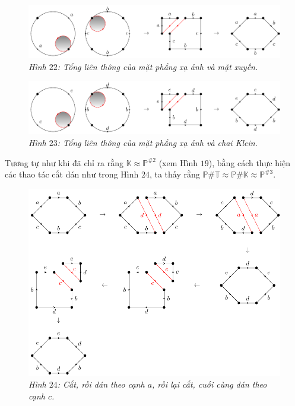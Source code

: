 \begin{multicols}{2}
\begin{figure}[H]
		\vspace*{-5pt}
		\centering\captionsetup{labelformat=empty, justification=centering}
		\includegraphics[width=1\linewidth]{H22.pdf}
		\caption{\small\textit{\color{duongvaotoanhoc}Hình $22$: Tổng liên thông của mặt phẳng xạ ảnh và mặt xuyến.}}
		\vspace*{-10pt}
	\end{figure}
	\begin{figure}[H]
		\vspace*{-5pt}
		\centering\captionsetup{labelformat=empty, justification=centering}
		\includegraphics[width=1\linewidth]{H23.pdf}
		\caption{\small\textit{\color{duongvaotoanhoc}Hình $23$: Tổng liên thông của mặt phẳng xạ ảnh và chai Klein.}}
		\vspace*{-10pt}
	\end{figure}
	Tương tự như khi đã chỉ ra rằng $\mathbb{K} \approx \mathbb{P}^{\# 2}$ (xem Hình $19$), bằng cách thực hiện các thao tác cắt dán như trong Hình $24$, ta thấy rằng $\mathbb{P} \# \mathbb{T} \approx \mathbb{P} \# \mathbb{K} \approx \mathbb{P}^{\# 3}$.
	\begin{figure}[H]
		\vspace*{-5pt}
		\centering\captionsetup{labelformat=empty, justification=centering}
		\includegraphics[width=1\linewidth]{H24.pdf}
		\caption{\small\textit{\color{duongvaotoanhoc}Hình $24$: Cắt, rồi dán theo cạnh $a$, rồi lại cắt, cuối cùng dán theo cạnh $c$.}}
		\vspace*{-5pt}
	\end{figure}
\end{multicols}

